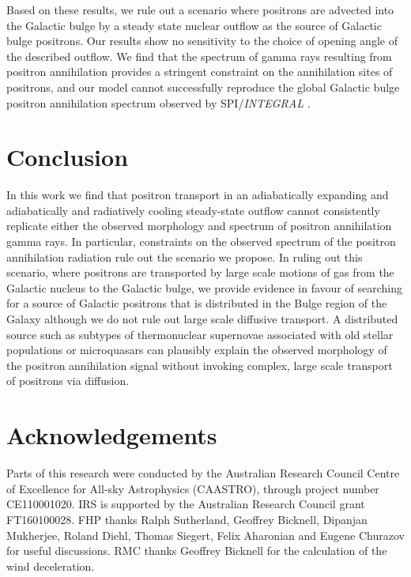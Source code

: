 \documentclass[a4paper,fleqn,usenatbib]{mnras}
\begin{document}
Based on these results, we rule out a scenario where positrons are advected into the Galactic bulge by a steady state nuclear outflow as the source of Galactic bulge positrons. Our results show no sensitivity to the choice of opening angle of the described outflow. We find that the spectrum of gamma rays resulting from positron annihilation provides a stringent constraint on the annihilation sites of positrons, and our model cannot successfully reproduce the global Galactic bulge positron annihilation spectrum observed by SPI/\textit{INTEGRAL} \citep{Siegert16}.
\section{Conclusion}\label{sec:discussion}
In this work we find that positron transport in an adiabatically expanding and adiabatically and radiatively cooling steady-state outflow cannot consistently replicate either the observed morphology and spectrum of positron annihilation gamma rays. In particular, constraints on the observed spectrum of the positron annihilation radiation rule out the scenario we propose. In ruling out this scenario, where positrons are transported by large scale motions of gas from the Galactic nucleus to the Galactic bulge, we provide evidence in favour of searching for a source of Galactic positrons that is distributed in the Bulge region of the Galaxy although we do not rule out large scale diffusive transport. A distributed source such as subtypes of thermonuclear supernovae associated with old stellar populations \citep{Crocker17} or microquasars \citep{Siegertmicroquasars} can plausibly explain the observed morphology of the positron annihilation signal without invoking complex, large scale transport of positrons via diffusion.\\
\section*{Acknowledgements}
Parts of this research were conducted by the Australian Research Council Centre of Excellence for All-sky Astrophysics (CAASTRO), through project number CE110001020. IRS is supported by the Australian Research Council grant FT160100028. FHP thanks Ralph Sutherland, Geoffrey Bicknell, Dipanjan Mukherjee, Roland Diehl, Thomas Siegert, Felix Aharonian and Eugene Churazov for useful discussions. RMC thanks Geoffrey Bicknell for the calculation of the wind deceleration.





%
%



\bsp	%
\label{lastpage}
\end{document}
